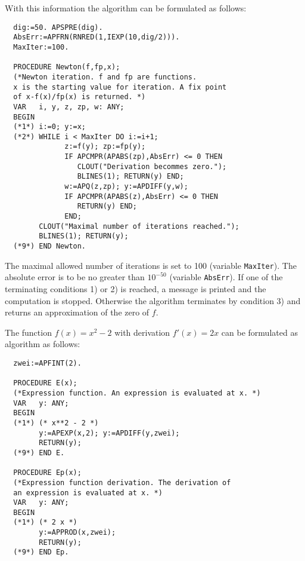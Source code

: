 With this information the algorithm can be formulated 
as follows: 
\begin{verbatim}
  dig:=50. APSPRE(dig). 
  AbsErr:=APFRN(RNRED(1,IEXP(10,dig/2))).
  MaxIter:=100.

  PROCEDURE Newton(f,fp,x);
  (*Newton iteration. f and fp are functions.
  x is the starting value for iteration. A fix point
  of x-f(x)/fp(x) is returned. *)
  VAR   i, y, z, zp, w: ANY;
  BEGIN 
  (*1*) i:=0; y:=x;
  (*2*) WHILE i < MaxIter DO i:=i+1;
              z:=f(y); zp:=fp(y);
              IF APCMPR(APABS(zp),AbsErr) <= 0 THEN
                 CLOUT("Derivation becommes zero."); 
                 BLINES(1); RETURN(y) END;
              w:=APQ(z,zp); y:=APDIFF(y,w);
              IF APCMPR(APABS(z),AbsErr) <= 0 THEN
                 RETURN(y) END;
              END;
        CLOUT("Maximal number of iterations reached."); 
        BLINES(1); RETURN(y);
  (*9*) END Newton. 
\end{verbatim}
The maximal allowed number of iterations is set to 100
(variable \verb/MaxIter/).
The absolute error is to be no greater than $10^{-50}$
(variable \verb/AbsErr/).
If one of the terminating conditions 1) or 2) is reached, 
a message is printed and the computation is stopped. 
Otherwise the algorithm terminates by condition 3) and returns 
an approximation of the zero of $f$.

The function $f(x) = x^2 - 2$ with derivation $f'(x) = 2 x$ 
can be formulated as algorithm as follows:
\begin{verbatim}
  zwei:=APFINT(2).

  PROCEDURE E(x);
  (*Expression function. An expression is evaluated at x. *)
  VAR   y: ANY;
  BEGIN 
  (*1*) (* x**2 - 2 *)
        y:=APEXP(x,2); y:=APDIFF(y,zwei);
        RETURN(y);
  (*9*) END E. 

  PROCEDURE Ep(x);
  (*Expression function derivation. The derivation of
  an expression is evaluated at x. *)
  VAR   y: ANY;
  BEGIN 
  (*1*) (* 2 x *)
        y:=APPROD(x,zwei);
        RETURN(y);
  (*9*) END Ep. 
\end{verbatim}

